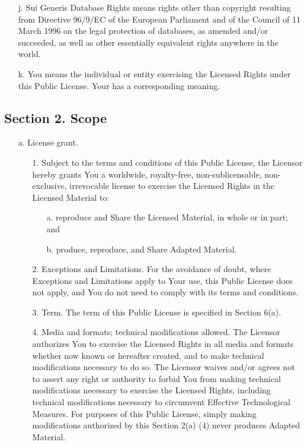 \begin{scriptsize}
\begin{itemize}
  \item[j.] Sui Generis Database Rights means rights other than copyright
     resulting from Directive 96/9/EC of the European Parliament and of
     the Council of 11 March 1996 on the legal protection of databases,
     as amended and/or succeeded, as well as other essentially
     equivalent rights anywhere in the world.

  \item[k.] You means the individual or entity exercising the Licensed Rights
     under this Public License. Your has a corresponding meaning.
\end{itemize}

\subsection*{Section 2. Scope}

\begin{itemize}
  \item[a.] License grant.

	\begin{itemize}
       \item[1.] Subject to the terms and conditions of this Public License,
          the Licensor hereby grants You a worldwide, royalty-free,
          non-sublicensable, non-exclusive, irrevocable license to
          exercise the Licensed Rights in the Licensed Material to:

		\begin{itemize}
            \item[a.] reproduce and Share the Licensed Material, in whole or
               in part; and

            \item[b.] produce, reproduce, and Share Adapted Material.
		\end{itemize}

       \item[2.] Exceptions and Limitations. For the avoidance of doubt, where
          Exceptions and Limitations apply to Your use, this Public
          License does not apply, and You do not need to comply with
          its terms and conditions.

       \item[3.] Term. The term of this Public License is specified in Section
          6(a).

       \item[4.] Media and formats; technical modifications allowed. The
          Licensor authorizes You to exercise the Licensed Rights in
          all media and formats whether now known or hereafter created,
          and to make technical modifications necessary to do so. The
          Licensor waives and/or agrees not to assert any right or
          authority to forbid You from making technical modifications
          necessary to exercise the Licensed Rights, including
          technical modifications necessary to circumvent Effective
          Technological Measures. For purposes of this Public License,
          simply making modifications authorized by this Section 2(a)
          (4) never produces Adapted Material.


\end{itemize}
\end{itemize}
\end{scriptsize}
